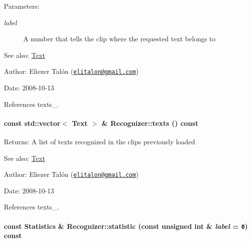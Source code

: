 \begin{Desc}
\item[Parameters:]
\begin{description}
\item[{\em label}]A number that tells the clip where the requested text belongs to\end{description}
\end{Desc}
\begin{Desc}
\item[See also:]\hyperlink{class_text}{Text}\end{Desc}
\begin{Desc}
\item[Author:]Eliezer Talón (\href{mailto:elitalon@gmail.com}{\tt elitalon@gmail.com}) \end{Desc}
\begin{Desc}
\item[Date:]2008-10-13 \end{Desc}


References texts\_\-.\hypertarget{class_recognizer_2a365c34f1447cdc3311d311e02bf2ed}{
\paragraph[texts]{\setlength{\rightskip}{0pt plus 5cm}const std::vector$<$ {\bf Text} $>$ \& Recognizer::texts () const}\hfill}
\label{class_recognizer_2a365c34f1447cdc3311d311e02bf2ed}


\begin{Desc}
\item[Returns:]A list of texts recognized in the clips previously loaded\end{Desc}
\begin{Desc}
\item[See also:]\hyperlink{class_text}{Text}\end{Desc}
\begin{Desc}
\item[Author:]Eliezer Talón (\href{mailto:elitalon@gmail.com}{\tt elitalon@gmail.com}) \end{Desc}
\begin{Desc}
\item[Date:]2008-10-13 \end{Desc}


References texts\_\-.\hypertarget{class_recognizer_b941b1ad42c3bacb3c829acf7fc689de}{
\paragraph[statistic]{\setlength{\rightskip}{0pt plus 5cm}const {\bf Statistics} \& Recognizer::statistic (const unsigned int \& {\em label} = {\tt 0}) const}\hfill}
\label{class_recognizer_b941b1ad42c3bacb3c829acf7fc689de}


